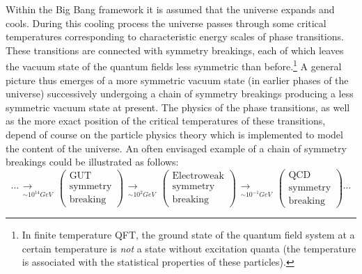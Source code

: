 \documentclass[12pt]{article}
\begin{document}
Within the Big Bang framework it is assumed that the universe
expands and cools. During this cooling process the universe passes
through some critical temperatures corresponding to characteristic
energy scales of phase transitions. These transitions are
connected with symmetry breakings, each of which leaves the vacuum
state of the quantum fields less symmetric than 
before.\footnote{In finite temperature QFT, the ground state of the
quantum field system at a certain temperature is {\em not} a state without
excitation quanta (the temperature is associated with
the statistical properties of these particles).} A general picture thus
emerges of a more symmetric vacuum state (in earlier phases of the
universe) successively undergoing a chain of symmetry breakings
producing a less symmetric vacuum state at present. The physics of
the phase transitions, as well as the more exact position of the
critical temperatures of these transitions, depend of course on
the particle physics theory which is implemented to model the
content of the universe. An often envisaged example of a chain of
symmetry breakings could be illustrated as follows: 
$$ \cdots
\begin{array}{c} \\ \longrightarrow\\ _{\sim 10^{14} GeV}
\end{array} \left( \begin{array}{c} \mbox{GUT} \\
\mbox{symmetry}\\ \mbox{breaking} \end{array} \right)
\begin{array}{c} \\ \longrightarrow\\ _{\sim 10^{2} GeV}
\end{array} \left( \begin{array}{c} \mbox{Electroweak} \\
\mbox{symmetry}\\ \mbox{breaking} \end{array} \right)
\begin{array}{c} \\ \longrightarrow\\ _{\sim 10^{-1} GeV}
\end{array} \left( \begin{array}{c} \mbox{QCD} \\ \mbox{symmetry}
\\ \mbox{breaking} \end{array} \right) \cdots 
$$
\end{document}
